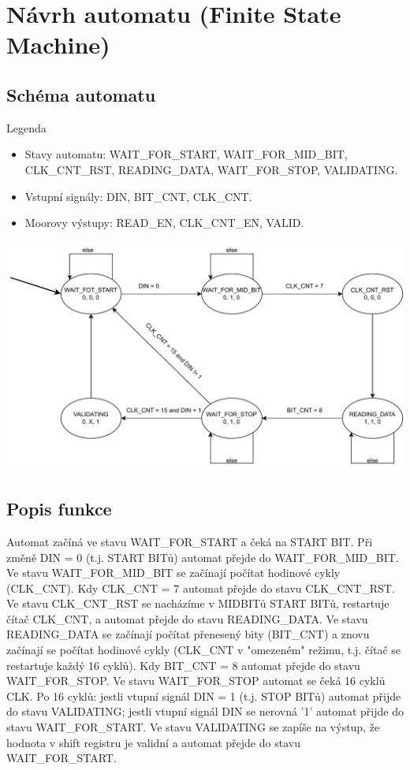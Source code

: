 \documentclass[a4paper, 11pt]{article}
\begin{document}
\newpage
\section{Návrh automatu (Finite State Machine)}
\subsection{Schéma automatu}
Legenda
\begin{itemize}
  \item Stavy automatu: WAIT\_FOR\_START, WAIT\_FOR\_MID\_BIT, CLK\_CNT\_RST, READING\_DATA, WAIT\_FOR\_STOP, VALIDATING.
  \item Vstupní signály: DIN, BIT\_CNT, CLK\_CNT.
  \item Moorovy výstupy: READ\_EN, CLK\_CNT\_EN, VALID.
\end{itemize}
\includegraphics[width=\textwidth,height=\textheight,keepaspectratio]{INC_FSM.pdf}
\subsection{Popis funkce}
Automat začíná ve stavu WAIT\_FOR\_START a čeká na START BIT. Při změně {DIN = 0} (t.j. START BITů) automat přejde do WAIT\_FOR\_MID\_BIT. Ve stavu WAIT\_FOR\_MID\_BIT se začínají počítat hodinové cykly (CLK\_CNT). Kdy CLK\_CNT = 7 automat přejde do stavu CLK\_CNT\_RST. Ve stavu CLK\_CNT\_RST se nacházíme v MIDBITů START BITů, restartuje čítač CLK\_CNT, a automat přejde do stavu READING\_DATA. Ve stavu READING\_DATA se začínají počítat přenesený bity (BIT\_CNT) a znovu začínají se počítat hodinové cykly  (CLK\_CNT v "omezeném" režimu, t.j. čítač se restartuje každý 16 cyklů). Kdy BIT\_CNT = 8 automat přejde do stavu WAIT\_FOR\_STOP. Ve stavu WAIT\_FOR\_STOP automat se čeká 16 cyklů CLK. Po 16 cyklů: jestli vtupní signál DIN = 1 (t.j. STOP BITů) automat přijde do stavu VALIDATING; jestli vtupní signál DIN se nerovná '1' automat přijde do stavu WAIT\_FOR\_START. Ve stavu VALIDATING se zapíše na výstup, že  hodnota v shift registru je validní a automat přejde do stavu WAIT\_FOR\_START.
\newpage
\end{document}
